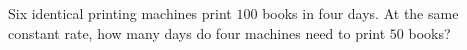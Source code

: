 Six identical printing machines print $100$ books in four days. At the same constant rate, how many days do four machines need to print $50$ books?
